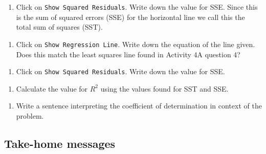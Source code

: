 \documentclass[
]{report}
\providecommand{\tightlist}{%
  \setlength{\itemsep}{0pt}\setlength{\parskip}{0pt}}
\begin{document}
\vspace{0.8in}

\begin{enumerate}
\def\labelenumi{\arabic{enumi}.}
\setcounter{enumi}{8}
\tightlist
\item
  Click on \texttt{Show\ Squared\ Residuals}. Write down the value for SSE. Since this is the sum of squared errors (SSE) for the horizontal line we call this the total sum of squares (SST).
\end{enumerate}

\newpage

\begin{enumerate}
\def\labelenumi{\arabic{enumi}.}
\setcounter{enumi}{9}
\tightlist
\item
  Click on \texttt{Show\ Regression\ Line}. Write down the equation of the line given. Does this match the least squares line found in Activity 4A question 4?
\end{enumerate}

\vspace{1in}

\begin{enumerate}
\def\labelenumi{\arabic{enumi}.}
\setcounter{enumi}{10}
\tightlist
\item
  Click on \texttt{Show\ Squared\ Residuals}. Write down the value for SSE.
\end{enumerate}

\vspace{0.5in}

\begin{enumerate}
\def\labelenumi{\arabic{enumi}.}
\setcounter{enumi}{11}
\tightlist
\item
  Calculate the value for \(R^2\) using the values found for SST and SSE.
\end{enumerate}

\vspace{1in}

\begin{enumerate}
\def\labelenumi{\arabic{enumi}.}
\setcounter{enumi}{12}
\tightlist
\item
  Write a sentence interpreting the coefficient of determination in context of the problem.
\end{enumerate}

\newpage

\hypertarget{take-home-messages-7}{%
\subsection{Take-home messages}\label{take-home-messages-7}}
\end{document}
